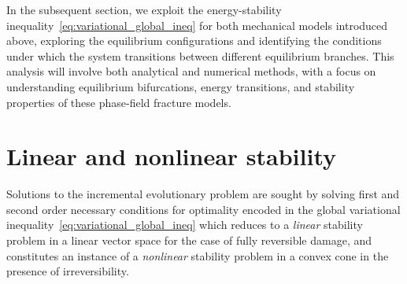 

In the subsequent section, we exploit the energy-stability inequality~\eqref{eq:variational_global_ineq} for both mechanical models introduced above, exploring the equilibrium configurations and identifying the conditions under which the system transitions between different equilibrium branches. 
This analysis will involve both analytical and numerical methods, with a focus on understanding equilibrium bifurcations, energy transitions, and stability properties of these phase-field fracture models.






% 

\section{Linear and nonlinear stability}
\label{sec:stability}

Solutions to the incremental evolutionary problem are sought by solving first and second order necessary conditions for optimality encoded in the global variational inequality~\eqref{eq:variational_global_ineq} which reduces to a \emph{linear} stability problem in a linear vector space for the case of fully reversible damage, and constitutes an instance of a \emph{nonlinear} stability problem in a convex cone in the presence of irreversibility.


